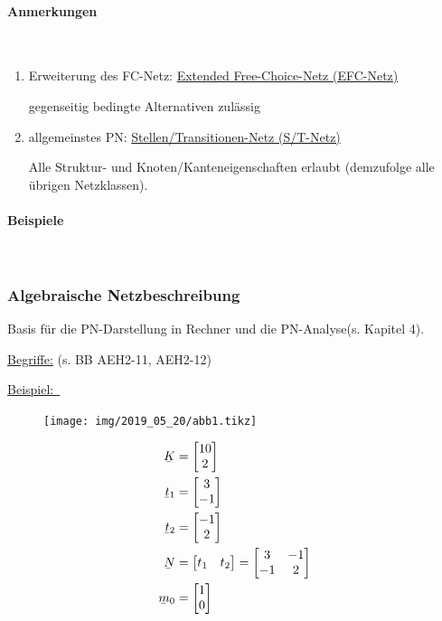 \documentclass[12pt,a4paper]{scrartcl}
\numberwithin{equation}{section}
\newcommand{\properparagraph}[1]{\paragraph{#1}\mbox{}\\}
\newcommand{\beispiel}{\underline{Beispiel:~}}
\newcommand{\ubar}[1]{\underaccent{\bar}{#1}}
\begin{document}
\properparagraph{Anmerkungen}
\begin{enumerate}
	\item Erweiterung des FC-Netz: \underline{Extended Free-Choice-Netz (EFC-Netz)}
	
	gegenseitig bedingte Alternativen zulässig
	
	\item allgemeinstes PN: \underline{Stellen/Transitionen-Netz (S/T-Netz)}
	
	Alle Struktur- und Knoten/Kanteneigenschaften erlaubt (demzufolge alle übrigen Netzklassen).
\end{enumerate}

\properparagraph{Beispiele}


\subsubsection{Algebraische Netzbeschreibung}
Basis für die PN-Darstellung in Rechner und die PN-Analyse(s. Kapitel 4).

\underline{Begriffe:} (s. BB AEH2-11, AEH2-12)

\beispiel

\begin{figure}[H]
	\centering
	\texttt{[image: img/2019\_05\_20/abb1.tikz]}
\end{figure}

\begin{subequations}
	\begin{align}
	\ubar{K}   &= \begin{bmatrix}10\\2\end{bmatrix} \\
	\ubar{t}_1 &= \begin{bmatrix}3\\-1\end{bmatrix}\\
	\ubar{t}_2 &= \begin{bmatrix}-1\\2\end{bmatrix}\\
	\ubar{N}   &= \begin{bmatrix}t_1 & t_2\end{bmatrix} = \begin{bmatrix}3 & -1 \\ -1 & 2\end{bmatrix}\\
	\ubar{m}_0 &= \begin{bmatrix}1 \\ 0\end{bmatrix}
	\end{align}
\end{subequations}
\end{document}
